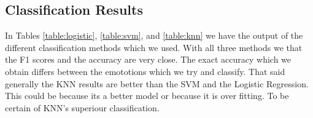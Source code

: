 \subsection{Classification Results}

In Tables \ref{table:logistic}, \ref{table:svm}, and \ref{table:knn}
we have the output of the different classification methods which we used.
With all three methods we that the F1 scores and the accuracy are very close.
The exact accuracy which we obtain differs between the emototions which we try and classify.
That said generally the KNN results are better than the SVM and the Logistic Regression.
This could be because its a better model or because it is over fitting.
To be certain of KNN's superiour classification.
